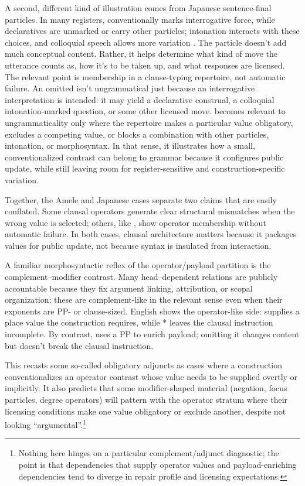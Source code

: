 \documentclass[12pt,letterpaper]{article}
\begin{document}
A second, different kind of illustration comes from Japanese sentence-final particles. In many registers,  conventionally marks interrogative force, while declaratives are unmarked or carry other particles; intonation interacts with these choices, and colloquial speech allows more variation \citep{kuno1973,shibatani1990}. The particle doesn't add much conceptual content. Rather, it helps determine what kind of move the utterance counts as, how it's to be taken up, and what responses are licensed. The relevant point is membership in a clause-typing repertoire, not automatic failure. An omitted  isn't ungrammatical just because an interrogative interpretation is intended: it may yield a declarative construal, a colloquial intonation-marked question, or some other licensed move.  becomes relevant to ungrammaticality only where the repertoire makes a particular value obligatory, excludes a competing value, or blocks a combination with other particles, intonation, or morphosyntax. In that sense, it illustrates how a small, conventionalized contrast can belong to grammar because it configures public update, while still leaving room for register-sensitive and construction-specific variation.

Together, the Amele and Japanese cases separate two claims that are easily conflated. Some clausal operators generate clear structural mismatches when the wrong value is selected; others, like , show operator membership without automatic failure. In both cases, clausal architecture matters because it packages values for public update, not because syntax is insulated from interaction.

A familiar morphosyntactic reflex of the operator/payload partition is the complement--modifier contrast. Many head--dependent relations are publicly accountable because they fix argument linking, attribution, or scopal organization; these are complement-like in the relevant sense even when their exponents are PP- or clause-sized. English  shows the operator-like side:  supplies a place value the construction requires, while * leaves the clausal instruction incomplete. By contrast,  uses a PP to enrich payload; omitting it changes content but doesn't break the clausal instruction.

This recasts some so-called obligatory adjuncts as cases where a construction conventionalizes an operator contrast whose value needs to be supplied overtly or implicitly. It also predicts that some modifier-shaped material (negation, focus particles, degree operators) will pattern with the operator stratum where their licensing conditions make one value obligatory or exclude another, despite not looking \enquote{argumental}.\footnote{Nothing here hinges on a particular complement/adjunct diagnostic; the point is that dependencies that supply operator values and payload-enriching dependencies tend to diverge in repair profile and licensing expectations.}
\end{document}
